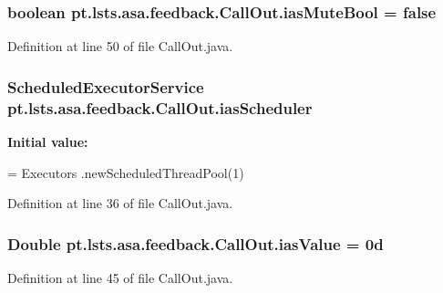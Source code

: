 \subsubsection[{ias\+Mute\+Bool}]{\setlength{\rightskip}{0pt plus 5cm}boolean pt.\+lsts.\+asa.\+feedback.\+Call\+Out.\+ias\+Mute\+Bool = false\hspace{0.3cm}{\ttfamily [private]}}\label{classpt_1_1lsts_1_1asa_1_1feedback_1_1CallOut_aa25d69118ba8f8a67d9a00111f251212}


Definition at line 50 of file Call\+Out.\+java.

\hypertarget{classpt_1_1lsts_1_1asa_1_1feedback_1_1CallOut_aaec22efe923c2b8ad2e347a619a47d6d}{}
\subsubsection[{ias\+Scheduler}]{\setlength{\rightskip}{0pt plus 5cm}Scheduled\+Executor\+Service pt.\+lsts.\+asa.\+feedback.\+Call\+Out.\+ias\+Scheduler\hspace{0.3cm}{\ttfamily [private]}}\label{classpt_1_1lsts_1_1asa_1_1feedback_1_1CallOut_aaec22efe923c2b8ad2e347a619a47d6d}
{\bfseries Initial value\+:}
\begin{DoxyCode}
= Executors
            .newScheduledThreadPool(1)
\end{DoxyCode}


Definition at line 36 of file Call\+Out.\+java.

\hypertarget{classpt_1_1lsts_1_1asa_1_1feedback_1_1CallOut_a6185a47dfdbf7690e1ab9db99d8a41da}{}
\subsubsection[{ias\+Value}]{\setlength{\rightskip}{0pt plus 5cm}Double pt.\+lsts.\+asa.\+feedback.\+Call\+Out.\+ias\+Value = 0d\hspace{0.3cm}{\ttfamily [private]}}\label{classpt_1_1lsts_1_1asa_1_1feedback_1_1CallOut_a6185a47dfdbf7690e1ab9db99d8a41da}


Definition at line 45 of file Call\+Out.\+java.



